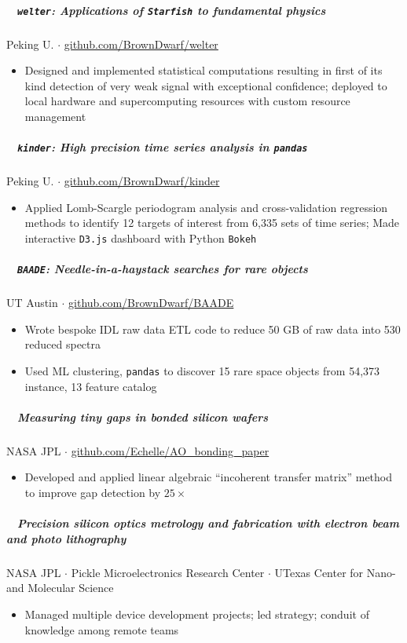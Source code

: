 \documentclass[10pt,letterpaper]{article}
\begin{document}
\subparagraph{\faBullseye ~ \texttt{welter}: Applications of \texttt{Starfish} to fundamental physics}
Peking U. $\cdot$ \href{https://github.com/BrownDwarf/welter/}{github.com/BrownDwarf/welter}
\begin{itemize}
    \item Designed and implemented statistical computations resulting in first of its kind detection of very weak signal with exceptional confidence; deployed to local hardware and supercomputing resources with custom resource management
\end{itemize}

\subparagraph{\faHourglassHalf ~ \texttt{kinder}: High precision time series analysis in \texttt{pandas}}
Peking U. $\cdot$ \href{https://github.com/BrownDwarf/kinder}{github.com/BrownDwarf/kinder}
\begin{itemize}
    \item Applied Lomb-Scargle periodogram analysis and cross-validation regression methods to identify 12 targets of interest from 6,335 sets of time series; Made interactive \texttt{D3.js} dashboard with Python \texttt{Bokeh}
\end{itemize}

\subparagraph{\faBinoculars ~ \texttt{BAADE}: Needle-in-a-haystack searches for rare objects}
UT Austin $\cdot$ \href{https://github.com/BrownDwarf/BAADE}{github.com/BrownDwarf/BAADE}
\begin{itemize}
    \item Wrote bespoke IDL raw data ETL code to reduce 50 GB of raw data into 530 reduced spectra
    \item Used ML clustering, \texttt{pandas} to discover 15 rare space objects from 54,373 instance, 13 feature catalog
\end{itemize}

\subparagraph{\faSuperscript ~ Measuring tiny gaps in bonded silicon wafers}
NASA JPL $\cdot$ \href{https://github.com/Echelle/AO_bonding_paper}{github.com/Echelle/AO\_bonding\_paper}
\begin{itemize}
    \item Developed and applied linear algebraic ``incoherent transfer matrix'' method to improve gap detection by $25\times$
\end{itemize}

\subparagraph{\faIndustry ~ Precision silicon optics metrology and fabrication with electron beam and photo lithography}
\begin{center} NASA JPL $\cdot$ Pickle Microelectronics Research Center $\cdot$ UTexas Center for Nano- and Molecular Science \end{center}
\begin{itemize}
    \item Managed multiple device development projects; led strategy; conduit of knowledge among remote teams
\end{itemize}
\end{document}
